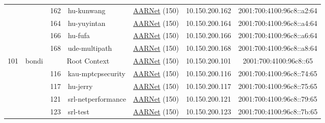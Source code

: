 \begin{small}
\begin{center}
\begin{longtable}{|c|c|c|c|c|c|c|c|}
  &  & \tiny{162} & \multicolumn{1}{|l|}{\tiny{hu-kunwang}} & \multicolumn{2}{|c|}{\tiny{\href{https://www.aarnet.edu.au/}{AARNet} (150)}} & \tiny{10.150.200.162} & \tiny{2001:700:4100:96c8::a2:64} \\* \cline{3-3}\cline{4-4}\cline{5-5}\cline{6-6}\cline{7-7}\cline{8-8}
  &  & \tiny{164} & \multicolumn{1}{|l|}{\tiny{hu-yuyintan}} & \multicolumn{2}{|c|}{\tiny{\href{https://www.aarnet.edu.au/}{AARNet} (150)}} & \tiny{10.150.200.164} & \tiny{2001:700:4100:96c8::a4:64} \\* \cline{3-3}\cline{4-4}\cline{5-5}\cline{6-6}\cline{7-7}\cline{8-8}
  &  & \tiny{166} & \multicolumn{1}{|l|}{\tiny{hu-fufa}} & \multicolumn{2}{|c|}{\tiny{\href{https://www.aarnet.edu.au/}{AARNet} (150)}} & \tiny{10.150.200.166} & \tiny{2001:700:4100:96c8::a6:64} \\* \cline{3-3}\cline{4-4}\cline{5-5}\cline{6-6}\cline{7-7}\cline{8-8}
  &  & \tiny{168} & \multicolumn{1}{|l|}{\tiny{ude-multipath}} & \multicolumn{2}{|c|}{\tiny{\href{https://www.aarnet.edu.au/}{AARNet} (150)}} & \tiny{10.150.200.168} & \tiny{2001:700:4100:96c8::a8:64} \\ \hline
 \multirow{28}{*}{\tiny{101}} & \multicolumn{1}{|l|}{\multirow{28}{*}{\tiny{bondi}}} & \multicolumn{2}{|c|}{\tiny{Root Context}} & \multicolumn{2}{|c|}{\tiny{\href{https://www.aarnet.edu.au/}{AARNet} (150)}} & \tiny{10.150.200.101} & \tiny{2001:700:4100:96c8::65} \\* \cline{3-3}\cline{4-4}\cline{5-5}\cline{6-6}\cline{7-7}\cline{8-8}
  &  & \tiny{116} & \multicolumn{1}{|l|}{\tiny{kau-mptcpsecurity}} & \multicolumn{2}{|c|}{\tiny{\href{https://www.aarnet.edu.au/}{AARNet} (150)}} & \tiny{10.150.200.116} & \tiny{2001:700:4100:96c8::74:65} \\* \cline{3-3}\cline{4-4}\cline{5-5}\cline{6-6}\cline{7-7}\cline{8-8}
  &  & \tiny{117} & \multicolumn{1}{|l|}{\tiny{hu-jerry}} & \multicolumn{2}{|c|}{\tiny{\href{https://www.aarnet.edu.au/}{AARNet} (150)}} & \tiny{10.150.200.117} & \tiny{2001:700:4100:96c8::75:65} \\* \cline{3-3}\cline{4-4}\cline{5-5}\cline{6-6}\cline{7-7}\cline{8-8}
  &  & \tiny{121} & \multicolumn{1}{|l|}{\tiny{srl-netperformance}} & \multicolumn{2}{|c|}{\tiny{\href{https://www.aarnet.edu.au/}{AARNet} (150)}} & \tiny{10.150.200.121} & \tiny{2001:700:4100:96c8::79:65} \\* \cline{3-3}\cline{4-4}\cline{5-5}\cline{6-6}\cline{7-7}\cline{8-8}
  &  & \tiny{123} & \multicolumn{1}{|l|}{\tiny{srl-test}} & \multicolumn{2}{|c|}{\tiny{\href{https://www.aarnet.edu.au/}{AARNet} (150)}} & \tiny{10.150.200.123} & \tiny{2001:700:4100:96c8::7b:65} \\* \cline{3-3}\cline{4-4}\cline{5-5}\cline{6-6}\cline{7-7}\cline{8-8}

\end{longtable}
\end{center}
\end{small}
